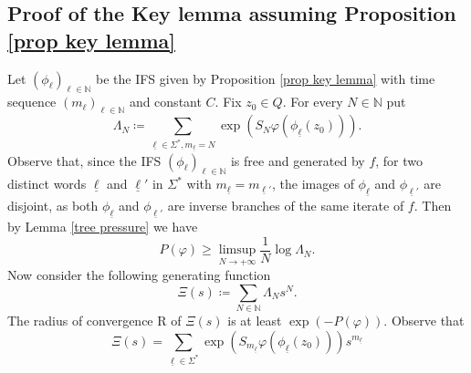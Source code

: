 \documentclass[12pt]{amsart}
\numberwithin{equation}{section} %
\numberwithin{figure}{section} %
\theoremstyle{plain}
\theoremstyle{definition}
\theoremstyle{remark}
\theoremstyle{citing}
\newcommand{\N}{\mathbb{N}}
\renewcommand{\=}{\coloneqq}
\begin{document}
\subsection{Proof of the Key lemma assuming Proposition \ref{prop key lemma}}
 Let $(\phi_{\ell})_{\ell\in \N}$ be the IFS given by Proposition \ref{prop key lemma} with time sequence $(m_\ell)_{\ell\in \N}$ and constant $C$. Fix $z_0 \in Q$. For every $N\in \N$ put
    \begin{equation}
      \Lambda_N\=\sum_{\underline{\ell}\in \Sigma^*, m_{\underline{\ell}}=N} \exp(S_N\varphi (\phi_{\underline{\ell}}(z_0))).
    \end{equation}
   Observe that, since the IFS $(\phi_{\ell})_{\ell\in \N}$ is free and generated by $f$, for two distinct words $\underline{\ell}$ and $\underline{\ell}'$ in $\Sigma^*$ with $m_{\underline{\ell}}=m_{\underline{\ell}'}$, the images of $\phi_{\underline{\ell}}$ and $\phi_{\underline{\ell}'}$ are disjoint, as both $\phi_{\underline{\ell}}$ and $\phi_{\underline{\ell}'}$ are inverse branches of the same iterate of $f$. Then by Lemma \ref{tree pressure} we have
    \begin{equation}
        P(\varphi) \geq \limsup_{N\to+\infty}\frac{1}{N}\log \Lambda_N.    
    \end{equation}
    Now consider the following generating function
    \begin{equation}
        \Xi(s) \= \sum_{N\in\N} \Lambda_N s^N.
    \end{equation}
    The radius of convergence R of $\Xi(s)$ is at least $\exp(-P(\varphi))$. Observe that
    \begin{equation}
        \Xi(s)= \sum_{\underline{\ell}\in \Sigma^*}\exp( S_{m_{\underline{\ell}}} \varphi (\phi_{\underline{\ell}}(z_0)))s^{m_{\underline{\ell}}}
    \end{equation}
    
\end{document}
